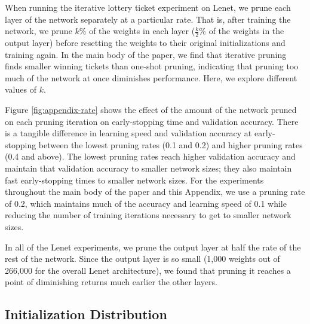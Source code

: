 When running the iterative lottery ticket experiment on Lenet, we prune each layer of the network separately at a particular rate. That is, after training the network,
we prune $k\%$ of the weights in each layer ($\frac{k}{2}\%$ of the weights in the output layer) before resetting the weights to their original initializations and
training again. In the main body of the paper, we find that iterative pruning finds smaller winning tickets than one-shot pruning, indicating that pruning too much
of the network at once diminishes performance.
Here, we explore different values of $k$.

Figure \ref{fig:appendix-rate} shows the effect of the amount of the network pruned on each pruning iteration on early-stopping time and validation accuracy.
There is a tangible difference in learning speed and validation accuracy at early-stopping between the lowest pruning
rates (0.1 and 0.2) and higher pruning rates (0.4 and above). The lowest pruning rates reach higher validation accuracy and maintain that validation
accuracy to smaller network
sizes; they also maintain fast early-stopping times to smaller network sizes. For the experiments throughout the main body of the paper and this Appendix, we use
a pruning rate of 0.2, which maintains much of the accuracy and learning speed of 0.1 while reducing the number of training iterations necessary to get
to smaller network sizes.

In all of the Lenet experiments, we prune the output layer at half the rate of the rest of the network. Since the output layer is so small (1,000 weights out of 266,000 for
the overall Lenet architecture), we found that pruning it reaches a point of diminishing returns much earlier the other layers.

\subsection{Initialization Distribution}

